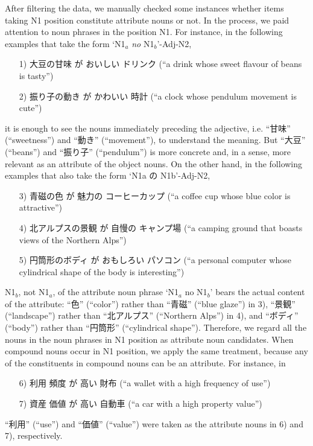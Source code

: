 \documentclass[english]{jnlp_1.4}
\begin{document}
After filtering the data, we manually checked some instances whether
items taking N1 position constitute attribute nouns or not. In the
process, we paid attention to noun phrases in the position N1. For
instance, in the following examples that take the form `N1$_{a}$ {\it
no} N1$_{b}$'-Adj-N2,
\begin{enumerate}
\item[1)] 大豆の甘味 が    おいしい  ドリンク (``a drink whose sweet flavour of beans is tasty'')
\item[2)] 振り子の動き が  かわいい  時計 (``a clock whose pendulum movement is cute'')
\end{enumerate}
it is enough to see the nouns immediately preceding the adjective, i.e.
``甘味'' (``sweetness'') and ``動き'' (``movement''), to understand the meaning. But 
``大豆'' (``beans'') and ``振り子'' (``pendulum'') is more concrete and, in a 
sense, more relevant as an attribute of the object nouns. On 
the other hand, in the following examples that also take the form 
`N1a の N1b'-Adj-N2,
\begin{enumerate}
\item[3)] 青磁の色 が 魅力の コーヒーカップ (``a coffee cup whose blue color is attractive'')
\item[4)] 北アルプスの景観 が 自慢の キャンプ場 (``a camping ground that boasts views of the Northern Alps'')
\item[5)] 円筒形のボディ が おもしろい パソコン (``a personal computer
whose cylindrical shape of the body is interesting'')
\end{enumerate}
N1$_{b}$, not N1$_{a}$, of the attribute noun phrase `N1$_{a}$ no
N1$_{b}$' bears the actual content of the attribute: ``色'' (``color'')
rather than ``青磁'' (``blue glaze'') in 3), ``景観'' (``landscape'')
rather than ``北アルプス'' (``Northern Alps'') in 4), and ``ボディ''
(``body'') rather than ``円筒形'' (``cylindrical shape''). Therefore, we
regard all the nouns in the noun phrases in N1 position as attribute
noun candidates. When compound nouns occur in N1 position, we apply the
same treatment, because any of the constituents in compound nouns can be
an attribute. For instance, in
\begin{enumerate}
\item[6)] 利用 頻度 が    高い    財布 (``a wallet with a high frequency of use'')
\item[7)] 資産 価値 が    高い    自動車 (``a car with a high property value'')
\end{enumerate}
``利用'' (``use'') and ``価値'' (``value'') were taken as the attribute nouns 
in 6) and 7), respectively.
\end{document}
